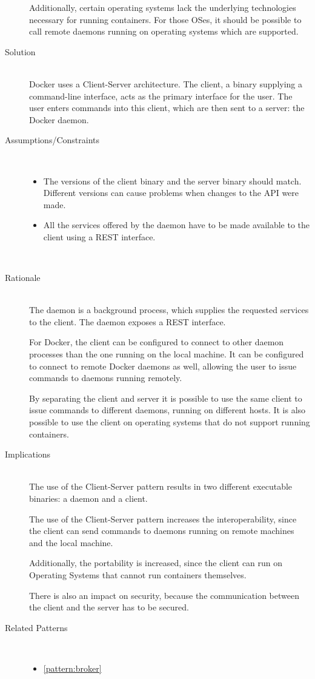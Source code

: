 \begin{description}
Additionally, certain operating systems lack the underlying technologies necessary for running containers. For those OSes, it should be possible to call remote daemons running on operating systems which are supported. %

\item [Solution]~\\
Docker uses a {Client-Server} architecture. The client, a binary supplying a command-line interface, acts as the primary interface for the user. The user enters commands into this client, which are then sent to a server: the Docker daemon. 


\item [Assumptions/Constraints]~
\begin{itemize}
\item The versions of the client binary and the server binary should match. Different versions can cause problems when changes to the API were made.
\item All the services offered by the daemon have to be made available to the client using a REST interface.
\end{itemize}
~\\[-1.7cm]
\item [Rationale] ~\\
The daemon is a background process, which supplies the requested services to the client. The daemon exposes a REST interface.

For Docker, the client can be configured to connect to other daemon processes than the one running on the local machine. It can be configured to connect to remote Docker daemons as well, allowing the user to issue commands to daemons running remotely.


By separating the client and server it is possible to use the same client to issue commands to different daemons, running on different hosts.
It is also possible to use the client on operating systems that do not support running containers.

\item [Implications]~\\
The use of the {Client-Server} pattern results in two different executable binaries: a daemon and a client. 

The use of the {Client-Server} pattern increases the interoperability, since the client can send commands to daemons running on remote machines and the local machine.

Additionally, the portability is increased, since the client can run on Operating Systems that cannot run containers themselves.

There is also an impact on security, because the communication between the client and the server has to be secured.

\item [Related Patterns]~
\begin{itemize}
\item \ref{pattern:broker}
\end{itemize}

\end{description}

